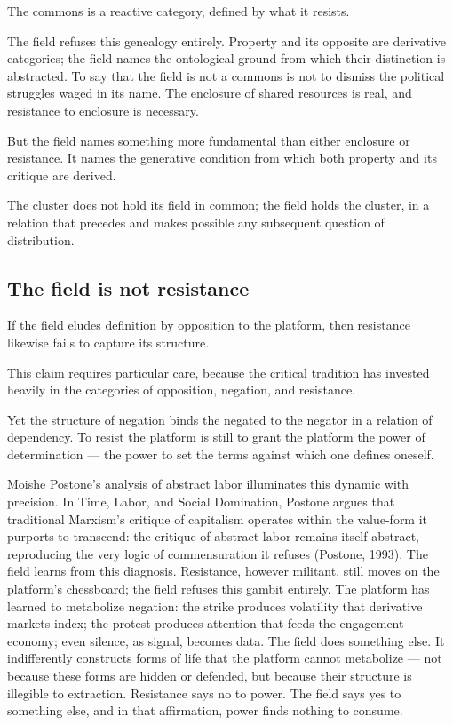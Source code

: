 The commons is a reactive category, defined by what it resists.

The field refuses this genealogy entirely. Property and its opposite are derivative categories; the field names the ontological ground from which their distinction is abstracted. To say that the field is not a commons is not to dismiss the political struggles waged in its name. The enclosure of shared resources is real, and resistance to enclosure is necessary.

But the field names something more fundamental than either enclosure or resistance. It names the generative condition from which both property and its critique are derived.

The cluster does not hold its field in common; the field holds the cluster, in a relation that precedes and makes possible any subsequent question of distribution.

\subsection{The field is not resistance}

If the field eludes definition by opposition to the platform, then resistance likewise fails to capture its structure.

This claim requires particular care, because the critical tradition has invested heavily in the categories of opposition, negation, and resistance.

Yet the structure of negation binds the negated to the negator in a relation of dependency. To resist the platform is still to grant the platform the power of determination — the power to set the terms against which one defines oneself.

Moishe Postone's analysis of abstract labor illuminates this dynamic with precision. In Time, Labor, and Social Domination, Postone argues that traditional Marxism's critique of capitalism operates within the value-form it purports to transcend: the critique of abstract labor remains itself abstract, reproducing the very logic of commensuration it refuses (Postone, 1993). The field learns from this diagnosis. Resistance, however militant, still moves on the platform's chessboard; the field refuses this gambit entirely. The platform has learned to metabolize negation: the strike produces volatility that derivative markets index; the protest produces attention that feeds the engagement economy; even silence, as signal, becomes data. The field does something else. It indifferently constructs forms of life that the platform cannot metabolize — not because these forms are hidden or defended, but because their structure is illegible to extraction. Resistance says no to power. The field says yes to something else, and in that affirmation, power finds nothing to consume.

